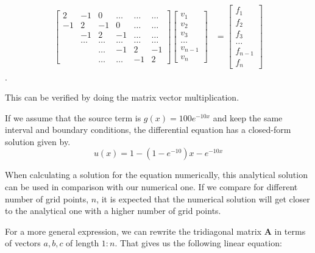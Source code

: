 \documentclass[a4paper,norsk,12pt,oneside]{article}
\begin{document}
\begin{align}
	\label{matrix_A}	
	\begin{bmatrix}
		2 & -1 & 0 & \hdots & \hdots & \hdots \\
		-1 & 2 & -1 & 0 & \hdots & \hdots \\
		& -1 & 2 & -1 & \hdots & \hdots \\
		& \hdots & \hdots & \hdots & \hdots & \hdots \\ 
		&& \hdots & -1 & 2 & -1 \\
		&& \hdots & \hdots & -1 & 2 
	\end{bmatrix} \begin{bmatrix}
	v_1 \\ v_2 \\ v_3 \\ \hdots \\ v_{n-1} \\ v_n
	\end{bmatrix} &= \begin{bmatrix}
	f_1 \\ f_2 \\ f_3 \\ \hdots \\ f_{n-1} \\ f_n
	\end{bmatrix}
\end{align}.  

This can be verified by doing the matrix vector multiplication.

If we assume that the source term is \(g(x) = 100e^{-10x}\) and keep the
same interval and boundary conditions, the differential equation has a 
closed-form solution given by.
\begin{equation*}
    u(x) = 1-(1-e^{-10})x - e^{-10x}
\end{equation*} 

When calculating a solution for the equation numerically, this analytical
solution can be used in comparison with our numerical one. If we compare 
for different number of grid points, \(n\), it is expected that the numerical solution
will get closer to the analytical one with a higher number of grid points. 

For a more general expression, we can rewrite the
tridiagonal matrix \(\textbf{A}\) in terms of vectors
\(a, b, c\) of length \(1 : n\). That gives us the following linear equation:
\end{document}
